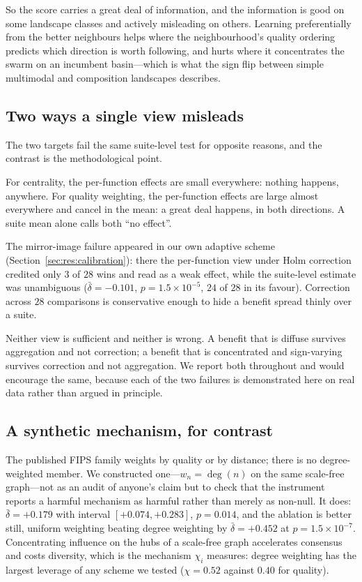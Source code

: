 So the score carries a great deal of information, and the information is
good on some landscape classes and actively misleading on others. Learning
preferentially from the better neighbours helps where the neighbourhood's
quality ordering predicts which direction is worth following, and hurts where
it concentrates the swarm on an incumbent basin---which is what the sign flip
between simple multimodal and composition landscapes describes.

\subsection{Two ways a single view misleads}
\label{sec:target2:views}

The two targets fail the same suite-level test for opposite reasons, and the
contrast is the methodological point.

For centrality, the per-function effects are small everywhere: nothing
happens, anywhere. For quality weighting, the per-function effects are large
almost everywhere and cancel in the mean: a great deal happens, in both
directions. A suite mean alone calls both ``no effect''.

The mirror-image failure appeared in our own adaptive scheme
(Section~\ref{sec:res:calibration}): there the per-function view under Holm
correction credited only $3$ of $28$ wins and read as a weak effect, while the
suite-level estimate was unambiguous ($\bar{\delta}=-0.101$,
$p=1.5\times10^{-5}$, $24$ of $28$ in its favour). Correction across $28$
comparisons is conservative enough to hide a benefit spread thinly over a
suite.

Neither view is sufficient and neither is wrong. A benefit that is diffuse
survives aggregation and not correction; a benefit that is concentrated and
sign-varying survives correction and not aggregation. We report both
throughout and would encourage the same, because each of the two failures is
demonstrated here on real data rather than argued in principle.

\subsection{A synthetic mechanism, for contrast}
\label{sec:target2:synthetic}

The published FIPS family weights by quality or by distance; there is no
degree-weighted member. We constructed one---$w_n=\deg(n)$ on the same
scale-free graph---not as an audit of anyone's claim but to check that the
instrument reports a harmful mechanism as harmful rather than merely as
non-null. It does: $\bar{\delta}=+0.179$ with interval $[+0.074,+0.283]$,
$p=0.014$, and the ablation is better still, uniform weighting beating degree
weighting by $\bar{\delta}=+0.452$ at $p=1.5\times10^{-7}$. Concentrating
influence on the hubs of a scale-free graph accelerates consensus and costs
diversity, which is the mechanism $\chi_i$ measures: degree weighting has the
largest leverage of any scheme we tested ($\chi=0.52$ against $0.40$ for
quality).

